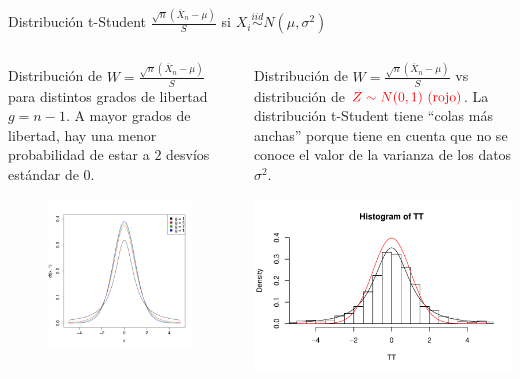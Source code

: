 \documentclass{beamer}
\theoremstyle{definition}
\begin{document}
 
\begin{frame}{\color{rosee}Distribución t-Student  $\frac{\sqrt{n}(\overline{X}_{n} - \mu)}{S}$ si $X_i\stackrel{iid}{\sim}N(\mu,\sigma^2)$}
\begin{columns}
    \begin{column}[t]{0.48\textwidth}
   \small Distribuci\'on de $W=\frac{\sqrt{n}(\overline{X}_{n} - \mu)}{S}$ para distintos grados de libertad $g=n-1$. A mayor grados de libertad, hay una menor probabilidad de estar a $2$ desvíos estándar de $0$.
  \begin{figure}
    \centering
    \includegraphics[height=.6\textheight]{img/variast}
  \end{figure}
  \end{column}
    \begin{column}[t]{0.48\textwidth}
  \small  Distribuci\'on de $W=\frac{\sqrt{n}(\overline{X}_{n} - \mu)}{S}$ vs distribución de $\color{red}Z\sim N(0,1) \text { (rojo)}$. La distribución t-Student tiene ``colas más anchas'' porque tiene en cuenta que no se conoce el valor de la varianza de los datos $\sigma^2$.
          \begin{center}
      \includegraphics[height=.45\textheight]{img/t-hist}

\end{center}
\end{column}
\end{columns}
\end{frame}
\end{document}
